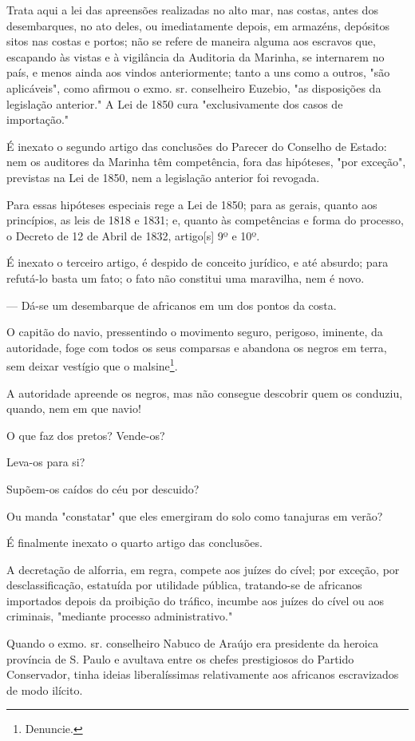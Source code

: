 Trata aqui a lei das apreensões realizadas no alto mar, nas costas,
antes dos desembarques, no ato deles, ou imediatamente depois, em
armazéns, depósitos sitos nas costas e portos; não se refere de maneira
alguma aos escravos que, escapando às vistas e à vigilância da Auditoria
da Marinha, se internarem no país, e menos ainda aos vindos
anteriormente; tanto a uns como a outros, "são aplicáveis", como afirmou
o exmo. sr. conselheiro Euzebio, "as disposições da legislação
anterior." A Lei de 1850 cura "exclusivamente dos casos de importação."

É inexato o segundo artigo das conclusões do Parecer do Conselho de
Estado: nem os auditores da Marinha têm competência, fora das hipóteses,
"por exceção", previstas na Lei de 1850, nem a legislação anterior foi
revogada.

Para essas hipóteses especiais rege a Lei de 1850; para as gerais,
quanto aos princípios, as leis de 1818 e 1831; e, quanto às competências
e forma do processo, o Decreto de 12 de Abril de 1832, artigo{[}s{]} 9º
e 10º.

É inexato o terceiro artigo, é despido de conceito jurídico, e até
absurdo; para refutá-lo basta um fato; o fato não constitui uma
maravilha, nem é novo.

--- Dá-se um desembarque de africanos em um dos pontos da costa.

O capitão do navio, pressentindo o movimento seguro, perigoso, iminente,
da autoridade, foge com todos os seus comparsas e abandona os negros em
terra, sem deixar vestígio que o malsine\footnote{Denuncie.}.

A autoridade apreende os negros, mas não consegue descobrir quem os
conduziu, quando, nem em que navio!

O que faz dos pretos? Vende-os?

Leva-os para si?

Supõem-os caídos do céu por descuido?

Ou manda "constatar" que eles emergiram do solo como tanajuras em verão?

É finalmente inexato o quarto artigo das conclusões.

A decretação de alforria, em regra, compete aos juízes do cível; por
exceção, por desclassificação, estatuída por utilidade pública,
tratando-se de africanos importados depois da proibição do tráfico,
incumbe aos juízes do cível ou aos criminais, "mediante processo
administrativo."

Quando o exmo. sr. conselheiro Nabuco de Araújo era presidente da
heroica província de S. Paulo e avultava entre os chefes prestigiosos do
Partido Conservador, tinha ideias liberalíssimas relativamente aos
africanos escravizados de modo ilícito.

